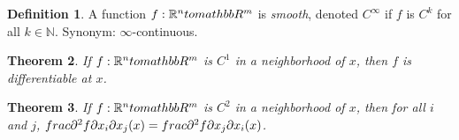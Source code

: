 \documentclass[11pt,leqno,oneside]{amsart}
\newtheorem{thm}{Theorem}[section]
\theoremstyle{definition}
\newtheorem{defn}[thm]{Definition}
\numberwithin{equation}{section}
\begin{document}
\begin{defn}
	A function $f:\mathbb{R}^n \\to \\mathbb{R}^m$ is \emph{smooth}, denoted $C^\infty$ if $f$ is $C^k$ for all $k \in \mathbb{N}$.
	Synonym: $\infty$-continuous.
\end{defn}
\begin{thm}
	If $f:\mathbb{R}^n \\to \\mathbb{R}^m$ is $C^1$ in a neighborhood of $x$, then $f$ is differentiable at $x$.
\end{thm}
\begin{thm}
	If $f:\mathbb{R}^n \\to \\mathbb{R}^m$ is $C^2$ in a neighborhood of $x$, then for all $i$ and $j$, $\\frac{\partial^2f}{\partial x_i \partial x_j}(x) = \\frac{\partial^2f}{\partial x_j \partial x_i}(x)$.
\end{thm}
\end{document}
